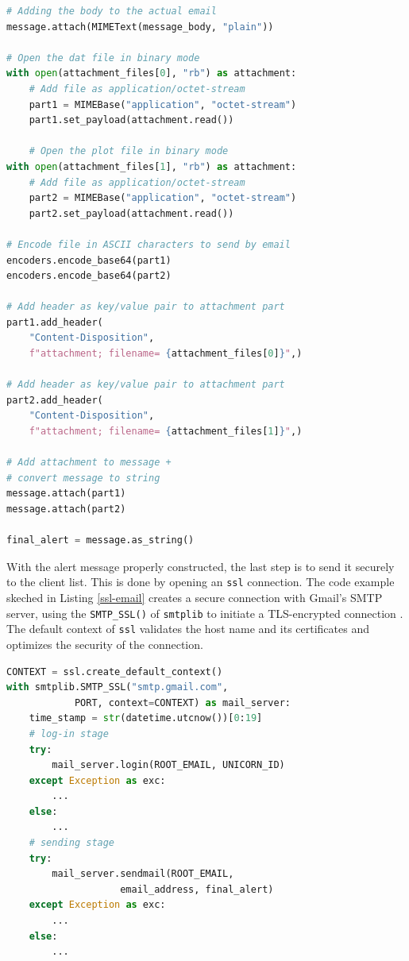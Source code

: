 \documentclass[conference]{IEEEtran}
\begin{document}
\begin{lstlisting}[language=Python, caption={Create attachments and save them securely by encoding them and embed them as string objects within the final object.},basicstyle=\footnotesize,label={create-email}]
# Adding the body to the actual email
message.attach(MIMEText(message_body, "plain"))

# Open the dat file in binary mode
with open(attachment_files[0], "rb") as attachment:
    # Add file as application/octet-stream
    part1 = MIMEBase("application", "octet-stream")
    part1.set_payload(attachment.read())

    # Open the plot file in binary mode
with open(attachment_files[1], "rb") as attachment:
    # Add file as application/octet-stream
    part2 = MIMEBase("application", "octet-stream")
    part2.set_payload(attachment.read())

# Encode file in ASCII characters to send by email
encoders.encode_base64(part1)
encoders.encode_base64(part2)

# Add header as key/value pair to attachment part
part1.add_header(
    "Content-Disposition",
    f"attachment; filename= {attachment_files[0]}",)

# Add header as key/value pair to attachment part
part2.add_header(
    "Content-Disposition",
    f"attachment; filename= {attachment_files[1]}",)

# Add attachment to message +
# convert message to string
message.attach(part1)
message.attach(part2)

final_alert = message.as_string()
\end{lstlisting}

With the alert message properly constructed, the last step is to send it securely to the client list. This is done by opening an \texttt{ssl} connection. The code example skeched in Listing \ref{ssl-email} creates a secure connection with Gmail’s SMTP server, using the \texttt{SMTP\_SSL()} of \texttt{smtplib} to initiate a TLS-encrypted connection \cite{emails}. The default context of \texttt{ssl} validates the host name and its certificates and optimizes the security of the connection.

\begin{lstlisting}[language=Python, caption={Procedure for sending the e-mail securely, through \textit{ssl}. The dotted code-base marks some debug steps that are irrelevant to the current discussion.},basicstyle=\footnotesize,label={ssl-email}]
CONTEXT = ssl.create_default_context()
with smtplib.SMTP_SSL("smtp.gmail.com", 
            PORT, context=CONTEXT) as mail_server:
    time_stamp = str(datetime.utcnow())[0:19]
    # log-in stage
    try:
        mail_server.login(ROOT_EMAIL, UNICORN_ID)
    except Exception as exc:
        ...
    else:
        ...
    # sending stage
    try:
        mail_server.sendmail(ROOT_EMAIL, 
                    email_address, final_alert)
    except Exception as exc:
        ...
    else:
        ...
\end{lstlisting}
\end{document}
